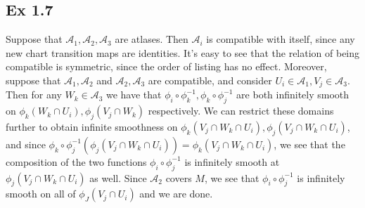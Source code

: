\documentclass{article}
\theoremstyle{definition}
\begin{document}
\subsection*{Ex 1.7}

Suppose that $\mathcal{A}_{1}, \mathcal{A}_{2}, \mathcal{A}_{3}$ are atlases.
Then $\mathcal{A}_i$ is compatible with itself, since any new chart transition
maps are identities. It's easy to see that the relation of being compatible is
symmetric, since the order of listing has no effect. Moreover, suppose that
$\mathcal{A}_1, \mathcal{A}_2$ and $\mathcal{A}_2, \mathcal{A}_3$ are
compatible, and consider $U_i \in \mathcal{A}_1, V_j \in \mathcal{A}_3$. Then
for any $W_k \in \mathcal{A}_3$ we have that $\phi_i \circ \phi_k^{-1}, \phi_k
\circ \phi_j^{-1}$ are both infinitely smooth on $\phi_k(W_k \cap U_i),
\phi_j(V_j \cap W_k)$ respectively. We can restrict these domains further to
obtain infinite smoothness on $\phi_k(V_j \cap W_k \cap U_i), \phi_j(V_j \cap
W_k \cap U_i)$, and since $\phi_k \circ \phi_j^{-1}(\phi_j(V_j \cap W_k \cap
U_i)) = \phi_k(V_j \cap W_k \cap U_i)$, we see that the composition of the two
functions $\phi_i \circ \phi_j^{-1}$ is infinitely smooth at $\phi_{j}(V_j \cap
W_k \cap U_i)$ as well. Since $\mathcal{A}_2$ covers $M$, we see that $\phi_i
\circ \phi_j^{-1}$ is infinitely smooth on all of $\phi_J(V_j \cap U_i)$ and we
are done.
\end{document}
